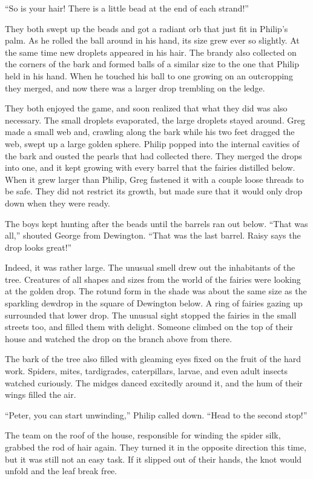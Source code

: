 \documentclass[10pt, draft]{memoir}
\begin{document}
``So is your hair! There is a little bead at the end of each strand!''

They both swept up the beads and got a radiant orb that just fit in Philip's
palm. As he rolled the ball around in his hand, its size grew ever so slightly.
At the same time new droplets appeared in his hair. The brandy also collected
on the corners of the bark and formed balls of a similar size to the one that
Philip held in his hand. When he touched his ball to one growing on an
outcropping they merged, and now there was a larger drop trembling on the
ledge.

They both enjoyed the game, and soon realized that what they did was also
necessary. The small droplets evaporated, the large droplets stayed around.
Greg made a small web and, crawling along the bark while his two feet dragged
the web, swept up a large golden sphere. Philip popped into the internal
cavities of the bark and ousted the pearls that had collected there. They
merged the drops into one, and it kept growing with every barrel that the
fairies distilled below. When it grew larger than Philip, Greg fastened it with
a couple loose threads to be safe. They did not restrict its growth, but made
sure that it would only drop down when they were ready.

The boys kept hunting after the beads until the barrels ran out below. ``That
was all,'' shouted George from Dewington. ``That was the last barrel. Raisy
says the drop looks great!''

Indeed, it was rather large. The unusual smell drew out the inhabitants of the
tree. Creatures of all shapes and sizes from the world of the fairies were
looking at the golden drop. The rotund form in the shade was about the same
size as the sparkling dewdrop in the square of Dewington below. A ring of
fairies gazing up surrounded that lower drop. The unusual sight stopped the
fairies in the small streets too, and filled them with delight. Someone climbed
on the top of their house and watched the drop on the branch above from there.

The bark of the tree also filled with gleaming eyes fixed on the fruit of the
hard work. Spiders, mites, tardigrades, caterpillars, larvae, and even adult
insects watched curiously. The midges danced excitedly around it, and the hum
of their wings filled the air.

``Peter, you can start unwinding,'' Philip called down. ``Head to the second
stop!''

The team on the roof of the house, responsible for winding the spider silk,
grabbed the rod of hair again. They turned it in the opposite direction this
time, but it was still not an easy task. If it slipped out of their hands, the
knot would unfold and the leaf break free.
\end{document}
